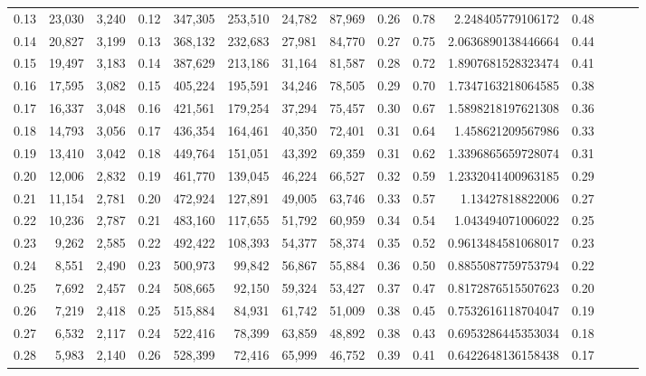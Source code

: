 \begin{tabular}{rrrrrrrrrrrrrrr}
0.13 &  23,030 &  3,240 &  0.12 &  347,305 &  253,510 &   24,782 &   87,969 &  0.26 &  0.78 &       2.248405779106172 &      0.48 \\
0.14 &  20,827 &  3,199 &  0.13 &  368,132 &  232,683 &   27,981 &   84,770 &  0.27 &  0.75 &      2.0636890138446664 &      0.44 \\
0.15 &  19,497 &  3,183 &  0.14 &  387,629 &  213,186 &   31,164 &   81,587 &  0.28 &  0.72 &      1.8907681528323474 &      0.41 \\
0.16 &  17,595 &  3,082 &  0.15 &  405,224 &  195,591 &   34,246 &   78,505 &  0.29 &  0.70 &      1.7347163218064585 &      0.38 \\
0.17 &  16,337 &  3,048 &  0.16 &  421,561 &  179,254 &   37,294 &   75,457 &  0.30 &  0.67 &      1.5898218197621308 &      0.36 \\
0.18 &  14,793 &  3,056 &  0.17 &  436,354 &  164,461 &   40,350 &   72,401 &  0.31 &  0.64 &       1.458621209567986 &      0.33 \\
0.19 &  13,410 &  3,042 &  0.18 &  449,764 &  151,051 &   43,392 &   69,359 &  0.31 &  0.62 &      1.3396865659728074 &      0.31 \\
0.20 &  12,006 &  2,832 &  0.19 &  461,770 &  139,045 &   46,224 &   66,527 &  0.32 &  0.59 &      1.2332041400963185 &      0.29 \\
0.21 &  11,154 &  2,781 &  0.20 &  472,924 &  127,891 &   49,005 &   63,746 &  0.33 &  0.57 &        1.13427818822006 &      0.27 \\
0.22 &  10,236 &  2,787 &  0.21 &  483,160 &  117,655 &   51,792 &   60,959 &  0.34 &  0.54 &       1.043494071006022 &      0.25 \\
0.23 &   9,262 &  2,585 &  0.22 &  492,422 &  108,393 &   54,377 &   58,374 &  0.35 &  0.52 &      0.9613484581068017 &      0.23 \\
0.24 &   8,551 &  2,490 &  0.23 &  500,973 &   99,842 &   56,867 &   55,884 &  0.36 &  0.50 &      0.8855087759753794 &      0.22 \\
0.25 &   7,692 &  2,457 &  0.24 &  508,665 &   92,150 &   59,324 &   53,427 &  0.37 &  0.47 &      0.8172876515507623 &      0.20 \\
0.26 &   7,219 &  2,418 &  0.25 &  515,884 &   84,931 &   61,742 &   51,009 &  0.38 &  0.45 &      0.7532616118704047 &      0.19 \\
0.27 &   6,532 &  2,117 &  0.24 &  522,416 &   78,399 &   63,859 &   48,892 &  0.38 &  0.43 &      0.6953286445353034 &      0.18 \\
0.28 &   5,983 &  2,140 &  0.26 &  528,399 &   72,416 &   65,999 &   46,752 &  0.39 &  0.41 &      0.6422648136158438 &      0.17 \\

\end{tabular}
